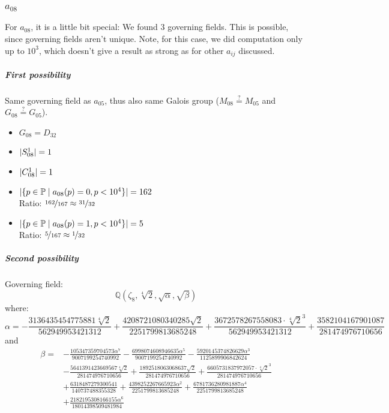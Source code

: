 \subsubsection{$a_{08}$}
For $a_{08}$, it is a little bit special: We found 3 governing fields. This is possible, since governing fields aren't unique. Note, for this case, we did computation only up to $10^3$, which doesn't give a result as strong as for other $a_{ij}$ discussed.
\subparagraph{First possibility}
Same governing field as $a_{05}$, thus also same Galois group ($M_{08} \stackrel{?}{=} M_{05}$ and $G_{08} \stackrel{?}{=} G_{05}$).
\begin{multicols}{2}
	\begin{itemize}
		\item $G_{08} = D_{32}$
		\item $| S_{08}^1 | = 1$
		\item $| C_{08}^1 | = 1$
	\end{itemize}
	\begin{itemize}
		\item $| \{ p \in \mathbb{P} \mid a_{08}(p)=0, p<10^4 \} | = 162$\\
		Ratio: $\nicefrac{ 162 }{ 167 } \approx \nicefrac{ 31 }{ 32 }$
		\item $| \{ p \in \mathbb{P} \mid a_{08}(p)=1, p<10^4 \} | = 5$\\
		Ratio: $\nicefrac{ 5 }{ 167 } \approx \nicefrac{ 1 }{ 32 }$
	\end{itemize}
\end{multicols}
\subparagraph{Second possibility}
Governing field:
$$\mathbb{Q}\left(\zeta_8, \sqrt[4]{2}, \sqrt{\alpha}, \sqrt{\beta}\right)$$
where:
$$\alpha = - \frac{3136435454775881 \sqrt[4]{2}}{562949953421312} + \frac{4208721080340285 \sqrt{2}}{2251799813685248} + \frac{3672578267558083 \cdot \sqrt[4]{2}^3}{562949953421312} + \frac{3582104167901087}{281474976710656}$$
and
\begin{align*}
\beta = 
&- \frac{105347359704573 \alpha^{7}}{9007199254740992} 
- \frac{6998074608946635 \alpha^{5}}{9007199254740992} 
- \frac{5920145374826629 \alpha^{3}}{1125899906842624} 
\\
&- \frac{5641391423669567 \sqrt[4]{2}}{281474976710656} 
+ \frac{1892518063068637 \sqrt{2}}{281474976710656} 
+ \frac{6605731837972057 \cdot \sqrt[4]{2}^3}{281474976710656} 
\\
&+ \frac{6318487279300541}{140737488355328} 
+ \frac{4398252267665923 \alpha^{2}}{2251799813685248} 
+ \frac{6781736280981887 \alpha^{4}}{2251799813685248} 
\\
&+ \frac{2182195308166155 \alpha^{6}}{18014398509481984}
\end{align*}
